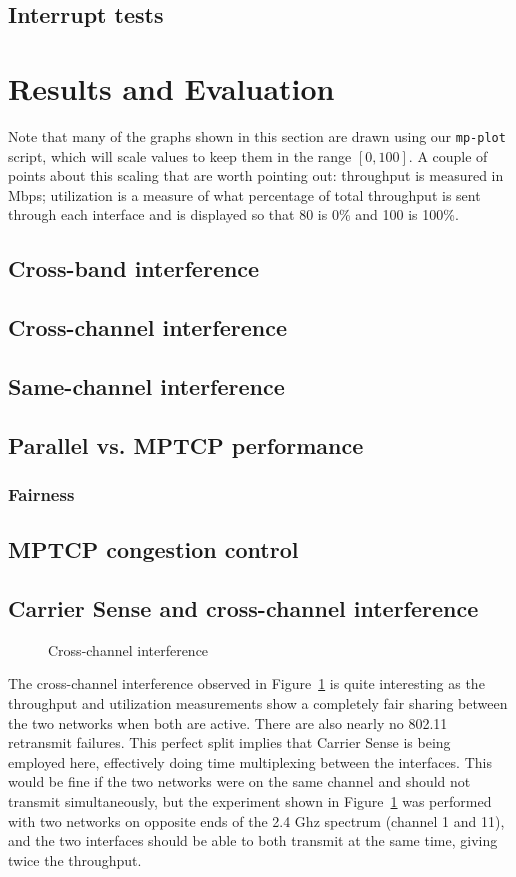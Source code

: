 \documentclass[12pt,a4paper]{article}
\begin{document}
\subsection{Interrupt tests}

\section{Results and Evaluation}
Note that many of the graphs shown in this section are drawn using our
\texttt{mp-plot} script, which will scale values to keep them in the range
$[0,100]$. A couple of points about this scaling that are worth pointing out:
throughput is measured in Mbps; utilization is a measure of what percentage of
total throughput is sent through each interface and is displayed so that 80 is
0\% and 100 is 100\%.
\subsection{Cross-band interference} %
\subsection{Cross-channel interference}
\subsection{Same-channel interference}
\subsection{Parallel vs. MPTCP performance}
\subsubsection{Fairness}
\subsection{MPTCP congestion control}
\subsection{Carrier Sense and cross-channel interference}
\begin{figure}[h]
 \centering
 
 \caption{Cross-channel interference}\label{graph:cc-interference}
\end{figure}

The cross-channel interference observed in Figure~\ref{graph:cc-interference} is
quite interesting as the throughput and utilization measurements show a
completely fair sharing between the two networks when both are active. There are
also nearly no 802.11 retransmit failures. This perfect split implies that
Carrier Sense is being employed here, effectively doing time multiplexing
between the interfaces.  This would be fine if the two networks were on the same
channel and should not transmit simultaneously, but the experiment shown in
Figure~\ref{graph:cc-interference} was performed with two networks on opposite
ends of the 2.4 Ghz spectrum (channel 1 and 11), and the two interfaces should
be able to both transmit at the same time, giving twice the throughput.
\end{document}
